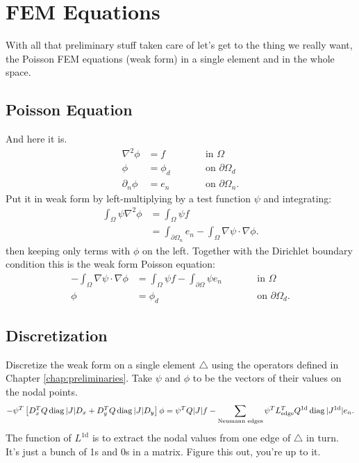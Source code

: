 \chapter{FEM Equations}
\label{chap:fem}

With all that preliminary stuff taken care of let's get to the thing we really want, the Poisson FEM equations (weak form) in a single element and in the whole space.

\section{Poisson Equation}

And here it is.
%
\begin{equation}
\begin{aligned}
\nabla^2 \phi &= f \qquad &&\textrm{in $\Omega$} \\
\phi &= \phi_d \qquad &&\textrm{on $\partial \Omega_d$} \\
\partial_n \phi &= e_n \qquad &&\textrm{on $\partial \Omega_n$.}
\end{aligned}
\end{equation}
%
Put it in weak form by left-multiplying by a test function $\psi$ and integrating:
%
\begin{equation}
\begin{aligned}
\int_\Omega \psi \nabla^2 \phi &= \int_\Omega \psi f \\
&= \int_{\partial \Omega_n} e_n - \int_\Omega \nabla \psi \cdot \nabla \phi.
\end{aligned}
\end{equation}
%
then keeping only terms with $\phi$ on the left.  Together with the Dirichlet boundary condition this is the weak form Poisson equation:
%
\begin{equation}
\boxed{
\begin{aligned}
- \int_\Omega \nabla \psi \cdot \nabla \phi &= \int_\Omega \psi f - \int_{\partial \Omega} \psi e_n \qquad &&\textrm{in $\Omega$} \\
\phi &= \phi_d \qquad &&\textrm{on $\partial \Omega_d$}.
\end{aligned}
}
\end{equation}

\section{Discretization}

Discretize the weak form on a single element $\bigtriangleup$ using the operators defined in Chapter \ref{chap:preliminaries}.  Take $\psi$ and $\phi$ to be the vectors of their values on the nodal points.
%
\begin{equation}
- \psi^T \left[ D_x^T Q \operatorname{diag} |J| D_x + D_y^T Q \operatorname{diag} |J| D_y \right] \phi = \psi^T Q |J| f - \sum_\textrm{Neumann edges} \psi^T L_\textrm{edge}^T Q^\textrm{1d}  \operatorname{diag}| J^\textrm{1d}| e_n.
\end{equation}
%
The function of $L^\textrm{1d}$ is to extract the nodal values from one edge of $\bigtriangleup$ in turn.  It's just a bunch of 1s and 0s in a matrix.  Figure this out, you're up to it.


